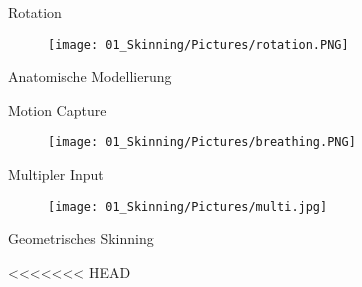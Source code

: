 {
	
	\begin{frame}{\Huge{Rotation}}
		
		\begin{figure}
			\texttt{[image: 01\_Skinning/Pictures/rotation.PNG]}
		\end{figure}
		
		
		
	\end{frame}
}

{ %
	\begin{frame}{\Huge{Anatomische Modellierung}}
		
		
		
		
	\end{frame}
} %

{
	
	\begin{frame}{\Huge{Motion Capture}}
		
		\begin{figure}
			\texttt{[image: 01\_Skinning/Pictures/breathing.PNG]}
		\end{figure}
		
		
		
	\end{frame}
}

	\begin{frame}{\Huge{Multipler Input}}

		
		\begin{figure}
			\texttt{[image: 01\_Skinning/Pictures/multi.jpg]}
		\end{figure}
		
		
		
	\end{frame}


{ %
	\begin{frame}{\colorbox{black!10}{\Huge{Geometrisches Skinning}}}
		
		
		
		
	\end{frame}
} %
<<<<<<< HEAD
